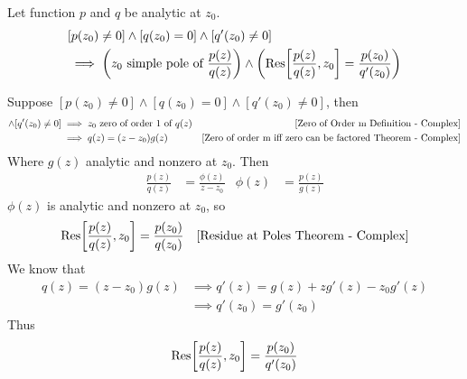 \documentclass[12pt, english]{book}
\makeatletter
\renewenvironment{proof}[1][\proofname]{\par
	\pushQED{\qed}%
	\normalfont \topsep6\p@\@plus6\p@\relax
	\list{}{%
		\settowidth{\leftmargin}{\itshape\proofname:\hskip\labelsep}%
		\setlength{\labelwidth}{0pt}%
		\setlength{\itemindent}{-\leftmargin}%
		}%
	\item[\hskip\labelsep\itshape#1\@addpunct{:}]\ignorespaces
	}{\popQED\endlist\@endpefalse}
\makeatother
\begin{document}
	\begin{theorem}
		\label{Residue of Simple Pole Theorem - Complex}
		Let function \(p\) and \(q\) be analytic at \(z_0\).
		\begin{align*}
			&[p(z_0) \neq 0] \land [q(z_0) = 0] \land [q'(z_0) \neq 0] \\
			&\implies \left(z_0 \text{ simple pole of } \frac{p(z)}{q(z)}\right) \land \left(\Res[\frac{p(z)}{q(z)}, z_0] = \frac{p(z_0)}{q'(z_0)} \right)
		\end{align*}
	\end{theorem}
	\begin{proof}
		Suppose \([p(z_0) \neq 0] \land [q(z_0) = 0] \land [q'(z_0) \neq 0]\), then 
		\begin{align*}
			[q(z_0) = 0] \land [q'(z_0) \neq 0]
			&\implies z_0 \text{ zero of order } 1 \text{ of } q(z)
				& \text{\Cref{Zero of Order m Definition - Complex}} \\
			&\implies q(z) = (z-z_0)g(z)
				& \text{\Cref{Zero of order m iff zero can be factored Theorem - Complex}}
		\end{align*}
		Where \(g(z)\) analytic and nonzero at \(z_0\). Then 
		\begin{align*}
			\frac{p(z)}{q(z)} &= \frac{\phi(z)}{z-z_0} & \phi(z) &= \frac{p(z)}{g(z)}
		\end{align*}
		\(\phi(z)\) is analytic and nonzero at \(z_0\), so
		\begin{align*}
			\Res[\frac{p(z)}{q(z)}, z_0] &= \frac{p(z_0)}{q(z_0)} 
				& \text{\Cref{Residue at Poles Theorem - Complex}}
		\end{align*}
		We know that 
		\begin{align*}
			q(z) = (z-z_0) g(z)
			&\implies q'(z) = g(z) + zg'(z) - z_0 g'(z) \\
			&\implies q'(z_0) = g'(z_0)
		\end{align*}
		Thus 
		\begin{align*}
			\Res[\frac{p(z)}{q(z)}, z_0] = \frac{p(z_0)}{q'(z_0)}
		\end{align*}
	\end{proof}
	
\end{document}

